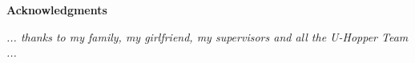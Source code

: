 \thispagestyle{empty}

\begin{center}
  {\bf \Huge Acknowledgments}
\end{center}

\vspace{4cm}


\emph{
  ... thanks to my family, my girlfriend, my supervisors and all the U-Hopper Team ...
}
